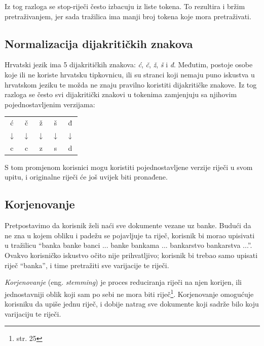 \documentclass[a4paper,twoside,12pt]{scrreprt}
\newenvironment{nscenter}
 {\par\nopagebreak\centering}
 {\parskip=0pt\par\noindent\ignorespacesafterend}
\begin{document}
Iz tog razloga se stop-riječi često izbacuju iz liste tokena. To rezultira i bržim pretraživanjem, jer sada tražilica ima manji broj tokena koje mora pretraživati.

\subsection{Normalizacija dijakritičkih znakova}

Hrvatski jezik ima 5 dijakritičkih znakova: \textit{ć}, \textit{č}, \textit{ž}, \textit{š} i \textit{đ}. Međutim, postoje osobe koje ili ne koriste hrvatsku tipkovnicu, ili su stranci koji nemaju puno iskustva u hrvatskom jeziku te možda ne znaju pravilno koristiti dijakritičke znakove. Iz tog razloga se često svi dijakritički znakovi u tokenima zamjenjuju sa njihovim pojednostavljenim verzijama:

\begin{nscenter}
  \begin{tabular}{ccccc}
    ć            & č            & ž            & š            & đ            \\
    $\downarrow$ & $\downarrow$ & $\downarrow$ & $\downarrow$ & $\downarrow$ \\
    c            & c            & z            & s            & d            \\
  \end{tabular}
\end{nscenter}

S tom promjenom korisnici mogu koristiti pojednostavljene verzije riječi u svom upitu, i originalne riječi će još uvijek biti pronađene.

\subsection{Korjenovanje}

Pretpostavimo da korisnik želi naći sve dokumente vezane uz banke. Budući da ne zna u kojem obliku i padežu se pojavljuje ta riječ, korisnik bi morao upisivati u tražilicu ``banka banke banci ... banke bankama ... bankarstvo bankarstva ...''. Ovakvo korisničko iskustvo očito nije prihvatljivo; korisnik bi trebao samo upisati riječ ``banka'', i time pretražiti sve varijacije te riječi.

\textit{Korjenovanje} (eng. \textit{stemming}) je proces reduciranja riječi na njen korijen, ili jednostavniji oblik koji sam po sebi ne mora biti riječ\footnote{\cite{taming} str. 25}. Korjenovanje omogućuje korisniku da upiše jednu riječ, i dobije natrag sve dokumente koji sadrže bilo koju varijaciju te riječi.
\end{document}
